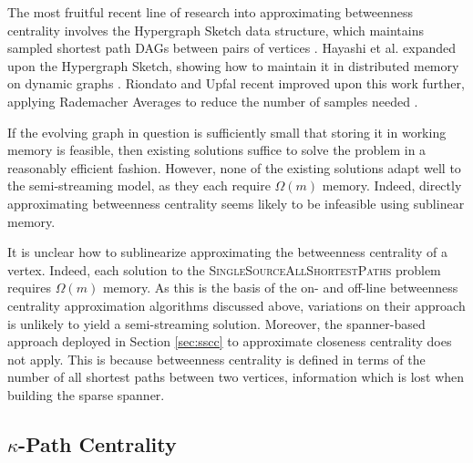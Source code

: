 \documentclass[10]{report}
\newcommand{\algoname}[1]{\textnormal{\textsc{#1}}}
\begin{document}
The most fruitful recent line of research into approximating betweenness centrality involves the Hypergraph Sketch data structure,  which maintains sampled shortest path DAGs between pairs of vertices \cite{yoshida2014almost}. 
Hayashi et al. expanded upon the Hypergraph Sketch, showing how to maintain it in distributed memory on dynamic graphs \cite{hayashi2015fully}. 
Riondato and Upfal recent improved upon this work further, applying Rademacher Averages to reduce the number of samples needed \cite{riondato2018abra}.

If the evolving graph in question is sufficiently small that storing it in working memory is feasible, then existing solutions suffice to solve the problem in a reasonably efficient fashion. 
However, none of the existing solutions adapt well to the semi-streaming model, as they each require $\Omega(m)$ memory. 
Indeed, directly approximating betweenness centrality seems likely to be infeasible using sublinear memory.

It is unclear how to sublinearize approximating the betweenness centrality of a vertex.
Indeed, each solution to the \algoname{SingleSourceAllShortestPaths} problem requires $\Omega(m)$ memory.
As this is the basis of the on- and off-line  betweenness centrality approximation algorithms discussed above, variations on their approach is unlikely to yield a semi-streaming solution.
Moreover, the spanner-based approach deployed in Section \ref{sec:sscc} to approximate closeness centrality does not apply.
This is because betweenness centrality is defined in terms of the number of all shortest paths between two vertices, information which is lost when building the sparse spanner.



\subsection{$\kappa$-Path Centrality} 
\label{sec:kpc}
\end{document}
